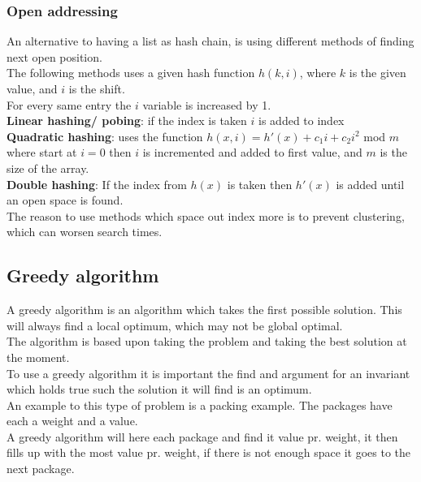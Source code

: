 \documentclass[12pt, a4paper]{article}
\begin{document}
				\subsubsection{Open addressing}
					An alternative to having a list as hash chain, is using different methods of finding next open position.\\
					The following methods uses a given hash function $h(k,i)$, where $k$ is the given value, and $i$ is the shift.\\
					For every same entry the $i$ variable is increased by 1.\\
					\textbf{Linear hashing/ pobing}: if the index is taken $i$ is added to index\\
					\textbf{Quadratic hashing}: uses the function $h(x,i)=h'(x)+c_1i+c_2i^2$ mod $m$ where start at $i=0$ then $i$ is incremented and added to first value, and $m$ is the size of the array.\\
					\textbf{Double hashing}: If the index from $h(x)$ is taken then $h'(x)$ is added until an open space is found.\\
					The reason to use methods which space out index more is to prevent clustering, which can worsen search times.
			\subsection{Greedy algorithm}
				A greedy algorithm is an algorithm which takes the first possible solution. This will always find a local optimum, which may not be global optimal.\\
				The algorithm is based upon taking the problem and taking the best solution at the moment.\\
				To use a greedy algorithm it is important the find and argument for an invariant which holds true such the solution it will find is an optimum.\\[4mm]
				An example to this type of problem is a packing example. The packages have each a weight and a value.\\
				A greedy algorithm will here each package and find it value pr. weight, it then fills up with the most value pr. weight, if there is not enough space it goes to the next package.\\
\end{document}
